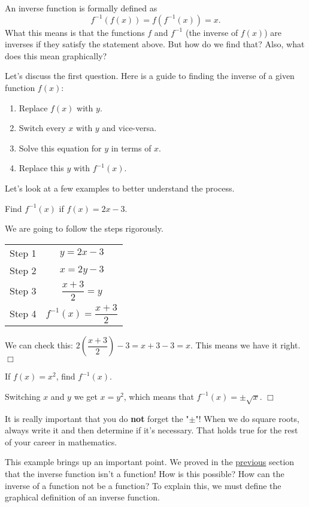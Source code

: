 \documentclass[../book.tex]{subfiles}
\begin{document}
An inverse function is formally defined as $$f^{-1}\left(f(x)\right)=f\left(f^{-1}(x)\right)=x.$$
What this means is that the functions $f$ and $f^{-1}$ (the inverse of $f(x)$) are inverses if they satisfy the statement above.  But how do we find that?  Also, what does this mean graphically?

Let's discuss the first question.  Here is a guide to finding the inverse of a given function $f(x)$: \begin{enumerate}
    \item Replace $f(x)$ with $y$.
    \item Switch every $x$ with $y$ and vice-versa.
    \item Solve this equation for $y$ in terms of $x$.
    \item Replace this $y$ with $f^{-1}(x)$.
\end{enumerate}
Let's look at a few examples to better understand the process.
\begin{example}
Find $f^{-1}(x)$ if $f(x)=2x-3$.
\end{example}
\begin{solution}
We are going to follow the steps rigorously.
\begin{center}
    \begin{tabular}{c c}
        Step 1 & $y=2x-3$ \\
        Step 2 & $x=2y-3$ \\
        Step 3 & $\dfrac{x+3}{2}=y$ \\
        Step 4 & $f^{-1}(x)=\dfrac{x+3}{2}$
    \end{tabular}
\end{center}
We can check this: $\displaystyle 2\left(\dfrac{x+3}{2}\right)-3=x+3-3=x$.  This means we have it right.  $\Box$
\end{solution}
\begin{example}
If $f(x)=x^2$, find $f^{-1}(x)$.
\end{example}
\begin{solution}
Switching $x$ and $y$ we get $x=y^2$, which means that $f^{-1}(x)=\pm\sqrt{x}$.  $\Box$
\end{solution}
\begin{note}
It is really important that you do \textbf{not} forget the "$\pm$"!  When we do square roots, always write it and then determine if it's necessary.  That holds true for the rest of your career in mathematics.
\end{note}
This example brings up an important point.  We proved in the \hyperlink{section.2.2}{previous} section that the inverse function isn't a function!  How is this possible?  How can the inverse of a function not be a function?  To explain this, we must define the graphical definition of an inverse function.
\end{document}

